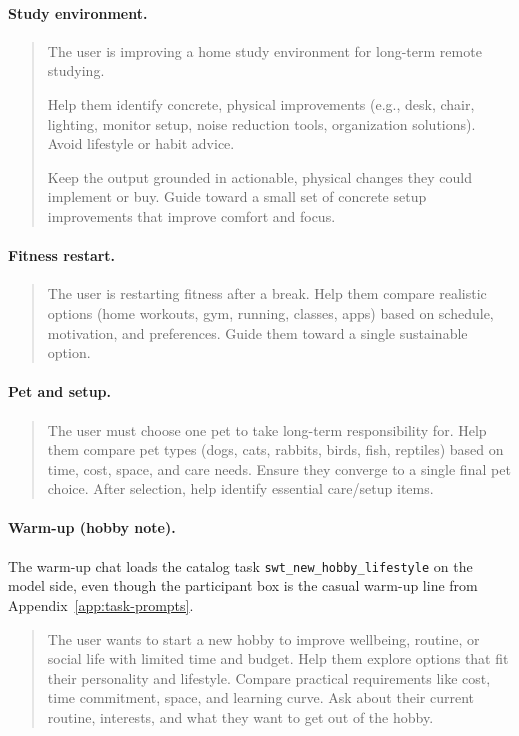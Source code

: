 \documentclass[english]{article}
\begin{document}
\paragraph{Study environment.}
\begin{quote}
The user is improving a home study environment for long-term remote studying.

Help them identify concrete, physical improvements (e.g., desk, chair, lighting, monitor setup, noise reduction tools, organization solutions). Avoid lifestyle or habit advice.

Keep the output grounded in actionable, physical changes they could implement or buy. Guide toward a small set of concrete setup improvements that improve comfort and focus.
\end{quote}

\paragraph{Fitness restart.}
\begin{quote}
The user is restarting fitness after a break. Help them compare realistic options (home workouts, gym, running, classes, apps) based on schedule, motivation, and preferences. Guide them toward a single sustainable option.
\end{quote}

\paragraph{Pet and setup.}
\begin{quote}
The user must choose one pet to take long-term responsibility for. Help them compare pet types (dogs, cats, rabbits, birds, fish, reptiles) based on time, cost, space, and care needs. Ensure they converge to a single final pet choice. After selection, help identify essential care/setup items.
\end{quote}

\paragraph{Warm-up (hobby note).}
The warm-up chat loads the catalog task \texttt{swt\_new\_hobby\_lifestyle} on the model side, even though the participant box is the casual warm-up line from Appendix~\ref{app:task-prompts}.

\begin{quote}
The user wants to start a new hobby to improve wellbeing, routine, or social life with limited time and budget. Help them explore options that fit their personality and lifestyle. Compare practical requirements like cost, time commitment, space, and learning curve. Ask about their current routine, interests, and what they want to get out of the hobby.
\end{quote}
\end{document}
